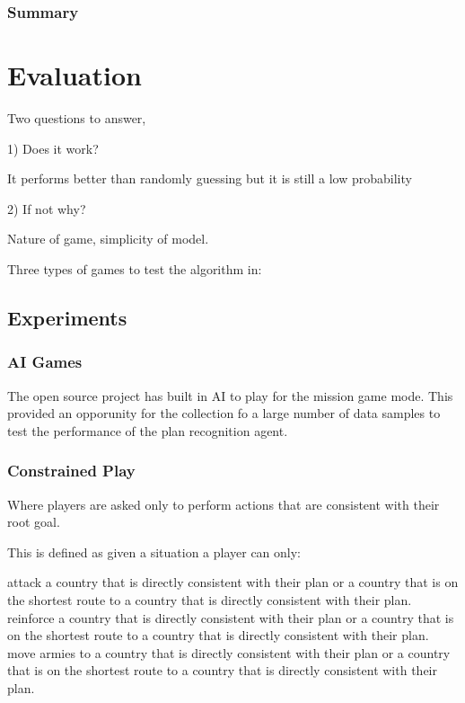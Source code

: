 \documentclass[parskip]{cs4rep}
\begin{document}
\subsection{Summary}

\chapter{Evaluation}

Two questions to answer, 

1) Does it work?

It performs better than randomly guessing but it is still a low probability

2) If not why?

Nature of game, simplicity of model.

Three types of games to test the algorithm in:

\section{Experiments}

\subsection{AI Games}

The open source project has built in AI to play for the mission game mode. This provided an opporunity for the collection fo a large number of data samples to test the performance of the plan recognition agent.

\subsection{Constrained Play}

Where players are asked only to perform actions that are consistent with their root goal.

This is defined as given a situation a player can only:

attack a country that is directly consistent with their plan or a country that is on the shortest route to a country that is directly consistent with their plan.
reinforce a country that is directly consistent with their plan or a country that is on the shortest route to a country that is directly consistent with their plan.
move armies to a country that is directly consistent with their plan or a country that is on the shortest route to a country that is directly consistent with their plan.
\end{document}
